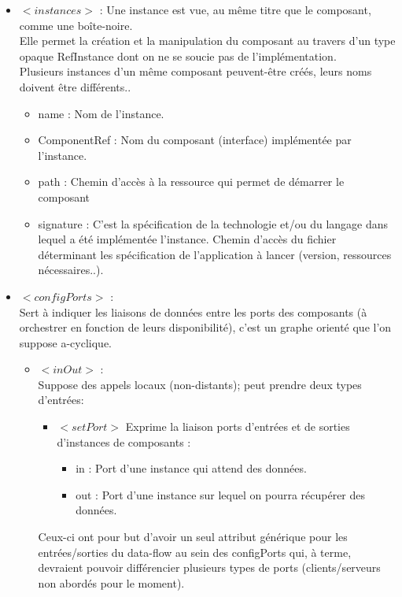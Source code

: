 \documentclass{article}
\begin{document}
\begin{itemize}
    \item $<instances>$ :
    Une instance est vue, au même titre que le composant, comme une boîte-noire.\\
    Elle permet la création et la manipulation du composant au travers d'un type opaque RefInstance dont on ne se soucie pas de l'implémentation.\\
    Plusieurs instances d'un même composant peuvent-être créés, leurs noms doivent être différents..
    \begin{itemize}
        \item name : Nom de l'instance.
        \item ComponentRef : Nom du composant (interface) implémentée par l'instance.
        \item path : Chemin d'accès à la ressource qui permet de démarrer le composant
        \item signature : C'est la spécification de la technologie et/ou du langage dans lequel a été implémentée l'instance. Chemin d'accès du fichier déterminant les spécification de l'application à lancer (version, ressources nécessaires..).
    \end{itemize}




    \item $<configPorts>$ :\\
    Sert à indiquer les liaisons de données entre les ports des composants (à orchestrer en fonction de leurs disponibilité), c'est un graphe orienté que l'on suppose a-cyclique.
    \begin{itemize}
        \item $<inOut>$ :\\
        Suppose des appels locaux (non-distants); peut prendre deux types d'entrées:
        \begin{itemize}
            \item $<setPort>$ Exprime la liaison ports d'entrées et de sorties d'instances de composants :
            \begin{itemize}
                \item in : Port d'une instance qui attend des données.
                \item out : Port d'une instance sur lequel on pourra récupérer des données.
            \end{itemize}
        \end{itemize}
        Ceux-ci ont pour but d'avoir un seul attribut générique pour les entrées/sorties du data-flow au sein des configPorts qui, à terme, devraient pouvoir différencier plusieurs types de ports (clients/serveurs non abordés pour le moment).
    \end{itemize}


\end{itemize}
\end{document}
